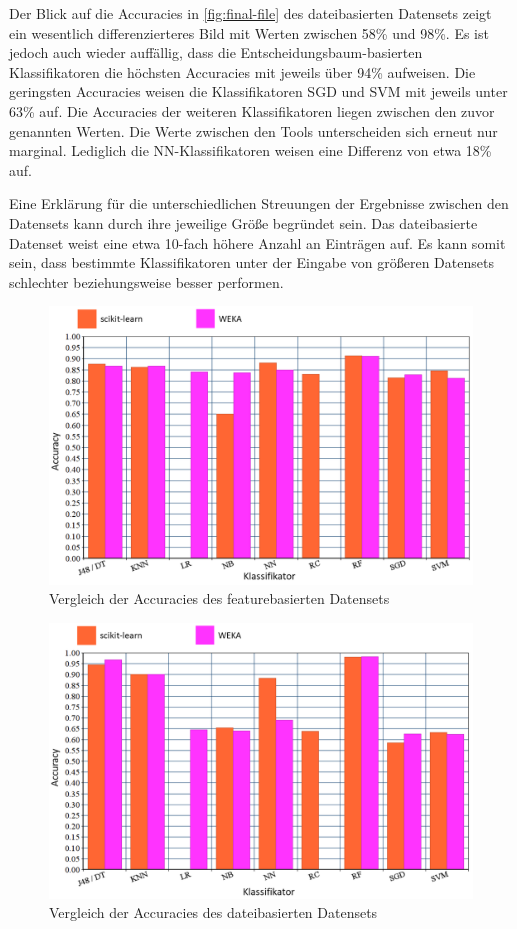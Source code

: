 Der Blick auf die Accuracies in \autoref{fig:final-file} des dateibasierten Datensets zeigt ein wesentlich differenzierteres Bild mit Werten zwischen 58\% und 98\%. Es ist jedoch auch wieder auffällig, dass die Entscheidungsbaum-basierten Klassifikatoren die höchsten Accuracies mit jeweils über 94\% aufweisen. Die geringsten Accuracies weisen die Klassifikatoren SGD und SVM mit jeweils unter 63\% auf. Die Accuracies der weiteren Klassifikatoren liegen zwischen den zuvor genannten Werten. Die Werte zwischen den Tools unterscheiden sich erneut nur marginal. Lediglich die NN-Klassifikatoren weisen eine Differenz von etwa 18\% auf.

Eine Erklärung für die unterschiedlichen Streuungen der Ergebnisse zwischen den Datensets kann durch ihre jeweilige Größe begründet sein. Das dateibasierte Datenset weist eine etwa 10-fach höhere Anzahl an Einträgen auf. Es kann somit sein, dass bestimmte Klassifikatoren unter der Eingabe von größeren Datensets schlechter beziehungsweise besser performen.

\begin{figure}[t]
    \centering
    \includegraphics[width=\textwidth]{images/feat_final}
    \caption{Vergleich der Accuracies des featurebasierten Datensets\label{fig:final-feat}}
\end{figure}

\begin{figure}[t]
    \centering
    \includegraphics[width=\textwidth]{images/file_final}
    \caption{Vergleich der Accuracies des dateibasierten Datensets\label{fig:final-file}}
\end{figure}

